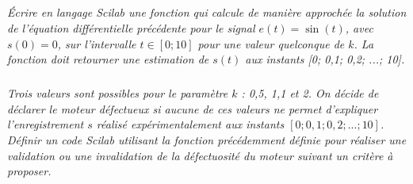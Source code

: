 \documentclass[10pt]{article}
\newif\ifprof
\begin{document}
\subparagraph{}
\textit{Écrire en langage Scilab une fonction qui calcule de manière approchée la solution de
l'équation différentielle précédente pour le signal $e(t) = \sin(t)$, avec $s(0) = 0$, sur l'intervalle
$t \in [0;10]$ pour une valeur quelconque de $k$. La fonction doit retourner une estimation de $s(t)$ aux instants \textsf{[0; 0,1; 0,2; ...; 10]}.}

\ifprof
\begin{corrige}
On pose $\dfrac{ds(t)}{dt}\simeq \dfrac{s(t+p)-s(t)}{p}$ en utilisant un schéma d'Euler explicite de pas $p$.

On a alors : $\dfrac{s_{n+1}-s_n}{p}=-k\dfrac{s_{n}-e_n}{10} \Longleftrightarrow 
s_{n+1}=-kp\dfrac{s_{n}-e_n}{10}+s_n$


\begin{python}
def solve(k,p):
    res=[0]
    e=[0]
    t=[0]
    i=1
    while i<=100:
        e.append(sin(i/10))
        res.append(res[i-1]-k*p*(res[i-1]-e[i-1])/10)
        t.append((i/10))
        i=i+1
    return t,res
\end{python}
\end{corrige}

\else
\fi



\subparagraph{}
\textit{Trois valeurs sont possibles pour le paramètre $k$ : 0,5, 1,1 et 2. On décide de déclarer
le moteur défectueux si aucune de ces valeurs ne permet d'expliquer l'enregistrement $s$ réalisé 
expérimentalement aux instants $[0; 0,1; 0,2;...; 10]$. Définir un code Scilab utilisant la fonction
précédemment définie pour réaliser une validation ou une invalidation de la défectuosité du
moteur suivant un critère à proposer.}
\ifprof
\begin{corrige}
Je ne sais pas.
\end{corrige}

\else
\fi
\end{document}
